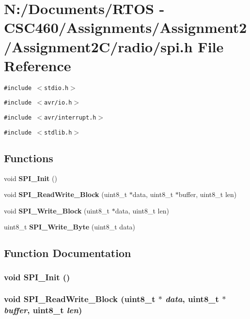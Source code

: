 \section{N:/Documents/RTOS - CSC460/Assignments/Assignment2/Assignment2C/radio/spi.h File Reference}
\label{spi_8h}
{\tt \#include $<$stdio.h$>$}\par
{\tt \#include $<$avr/io.h$>$}\par
{\tt \#include $<$avr/interrupt.h$>$}\par
{\tt \#include $<$stdlib.h$>$}\par
\subsection*{Functions}
\begin{CompactItemize}
\item 
void {\bf SPI\_\-Init} ()
\item 
void {\bf SPI\_\-Read\-Write\_\-Block} (uint8\_\-t $\ast$data, uint8\_\-t $\ast$buffer, uint8\_\-t len)
\item 
void {\bf SPI\_\-Write\_\-Block} (uint8\_\-t $\ast$data, uint8\_\-t len)
\item 
uint8\_\-t {\bf SPI\_\-Write\_\-Byte} (uint8\_\-t data)
\end{CompactItemize}


\subsection{Function Documentation}
\subsubsection{\setlength{\rightskip}{0pt plus 5cm}void SPI\_\-Init ()}\label{spi_8h_9405ec7074e866a9c74f393f11f18ede}


\subsubsection{\setlength{\rightskip}{0pt plus 5cm}void SPI\_\-Read\-Write\_\-Block (uint8\_\-t $\ast$ {\em data}, uint8\_\-t $\ast$ {\em buffer}, uint8\_\-t {\em len})}\label{spi_8h_913e605a835df4675d23b4bc61172a44}



